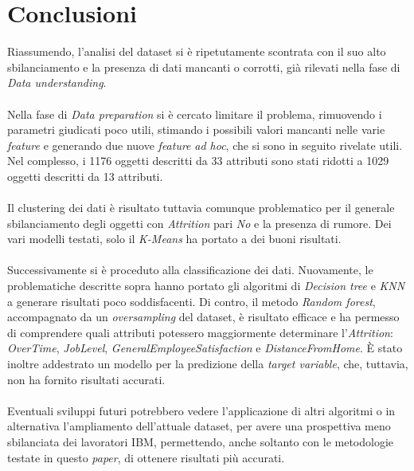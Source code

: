 \section{Conclusioni}
Riassumendo, l’analisi del dataset si è ripetutamente scontrata con il suo alto sbilanciamento e la presenza di dati mancanti o corrotti, già rilevati nella fase di \textit{Data understanding}.\\\\
Nella fase di \textit{Data preparation} si è cercato limitare il problema, rimuovendo i parametri giudicati poco utili, stimando i possibili valori mancanti nelle varie \textit{feature} e generando due nuove \textit{feature} \textit{ad hoc}, che si sono in seguito rivelate utili. Nel complesso, i 1176 oggetti descritti da 33 attributi sono stati ridotti a 1029 oggetti descritti da 13 attributi.\\\\
Il clustering dei dati è risultato tuttavia comunque problematico per il generale sbilanciamento degli oggetti con \textit{Attrition} pari \textit{No} e la presenza di rumore. Dei vari modelli testati, solo il \textit{K-Means} ha portato a dei buoni risultati. \\\\
Successivamente si è proceduto alla classificazione dei dati. Nuovamente, le problematiche descritte sopra hanno portato gli algoritmi di \textit{Decision tree} e \textit{KNN} a generare risultati poco soddisfacenti. Di contro, il metodo \textit{Random forest}, accompagnato da un \textit{oversampling} del dataset, è risultato efficace e ha permesso di comprendere quali attributi potessero maggiormente determinare l’\textit{Attrition}: \textit{OverTime}, \textit{JobLevel}, \textit{GeneralEmployeeSatisfaction} e \textit{DistanceFromHome}. È stato inoltre addestrato un modello per la predizione della \textit{target variable}, che, tuttavia, non ha fornito risultati accurati. \\\\
Eventuali sviluppi futuri potrebbero vedere l’applicazione di altri algoritmi o in alternativa l’ampliamento dell’attuale dataset, per avere una prospettiva meno sbilanciata dei lavoratori IBM, permettendo,  anche soltanto con le metodologie testate in questo \textit{paper}, di ottenere risultati più accurati.


